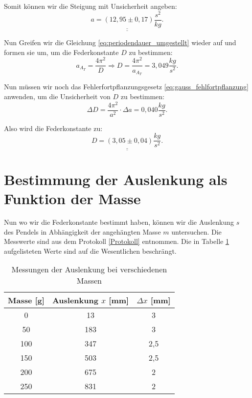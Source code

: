 Somit können wir die Steigung mit Unsicherheit angeben:
\begin{equation}
    \underline{\underline{a = (12,95 \pm 0,17) \frac{s^2}{kg}.}}
\end{equation}

Nun Greifen wir die Gleichung \eqref{eq:periodendauer_umgestellt} wieder auf und formen sie um, um die Federkonstante $D$ zu bestimmen:
\begin{equation}
    a_{A_T} = \frac{4\pi ^2}{D} \Rightarrow D = \frac{4 \pi^2}{a_{A_T}} = 3,049 \frac{kg}{s^2}.
\end{equation}

Nun müssen wir noch das Fehlerfortpflanzungsgesetz \eqref{eq:gauss_fehlfortpflanzung} anwenden, um die Unsicherheit von $D$ zu bestimmen:
\begin{equation}
    \Delta D = \frac{4 \pi^2}{a^2} \cdot \Delta a = 0,040 \frac{kg}{s^2}.
\end{equation}

Also wird die Federkonstante zu:
\begin{equation}
    \underline{\underline{D = (3,05 \pm 0,04) \frac{kg}{s^2}.}}
\end{equation}

\section{Bestimmung der Auslenkung als Funktion der Masse}
Nun wo wir die Federkonstante bestimmt haben, können wir die Auslenkung $s$ des Pendels in Abhängigkeit der angehängten Masse $m$ untersuchen. Die Messwerte sind aus dem Protokoll \ref{Protokoll} entnommen. Die in Tabelle \ref{tab:verschiedene_massen_auslenkung} aufgelisteten Werte sind auf die Wesentlichen beschrängt.
\begin{table}[h!]
    \centering
    \begin{tabular}{c | c | c}
    Masse [g] & Auslenkung $x$ [mm] & $\Delta x$ [mm] \\
    \hline
    0   & 13 & 3 \\
    50  & 183 & 3 \\
    100 & 347 & 2,5\\
    150 & 503 & 2,5 \\
    200 & 675 & 2 \\
    250 & 831 & 2 \\
    \hline
    \end{tabular}
    \caption{Messungen der Auslenkung bei verschiedenen Massen}
    \label{tab:verschiedene_massen_auslenkung}
\end{table}

